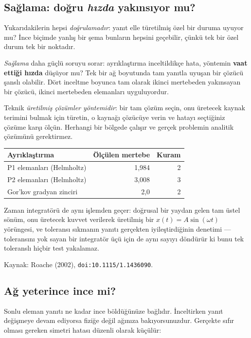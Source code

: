 \documentclass[11pt,a4paper]{article}
\begin{document}
\subsection*{Sağlama: doğru \emph{hızda} yakınsıyor mu?}

Yukarıdakilerin hepsi \emph{doğrulamadır}: yanıt elle türetilmiş özel bir duruma
uyuyor mu? İnce biçimde yanlış bir şema bunların hepsini geçebilir, çünkü tek bir
özel durum tek bir noktadır.

\emph{Sağlama} daha güçlü soruyu sorar: ayrıklaştırma inceltildikçe hata,
yöntemin \textbf{vaat ettiği hızda} düşüyor mu? Tek bir ağ boyutunda tam yanıtla
uyuşan bir çözücü şanslı olabilir. Dört inceltme boyunca tam olarak ikinci
mertebeden yakınsayan bir çözücü, ikinci mertebeden elemanları uyguluyordur.

Teknik \emph{üretilmiş çözümler yöntemidir}: bir tam çözüm seçin, onu üretecek
kaynak terimini bulmak için türetin, o kaynağı çözücüye verin ve hatayı seçtiğiniz
çözüme karşı ölçün. Herhangi bir bölgede çalışır ve gerçek problemin analitik
çözümünü gerektirmez.

\begin{center}\small
\begin{tabular}{lrr}
\toprule
\textbf{Ayrıklaştırma} & \textbf{Ölçülen mertebe} & \textbf{Kuram} \\
\midrule
P1 elemanları (Helmholtz) & 1,984 & 2 \\
P2 elemanları (Helmholtz) & 3,008 & 3 \\
Gor'kov gradyan zinciri & 2,0 & 2 \\
\bottomrule
\end{tabular}
\end{center}

Zaman integratörü de aynı işlemden geçer: doğrusal bir yaydan gelen tam üstel
sönüm, onu üretecek kuvvet verilerek üretilmiş bir $x(t) = A\sin(\omega t)$
yörüngesi, ve toleransı sıkmanın yanıtı gerçekten iyileştirdiğinin denetimi ---
toleransını yok sayan bir integratör üçü için de aynı sayıyı döndürür ki bunu tek
toleranslı hiçbir test yakalamaz.

Kaynak: Roache (2002), \texttt{doi:10.1115/1.1436090}.

\subsection*{Ağ yeterince ince mi?}

Sonlu eleman yanıtı ne kadar ince böldüğünüze bağlıdır. İnceltirken yanıt
değişmeye devam ediyorsa fiziğe değil ağınıza bakıyorsunuzdur. Gerçekte sıfır
olması gereken simetri hatası düzenli olarak küçülür:
\end{document}
